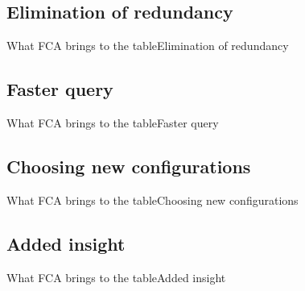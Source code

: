 \subsection{Elimination of redundancy}
\begin{frame}{What FCA brings to the table}{Elimination of redundancy}
\end{frame}

\subsection{Faster query}
\begin{frame}{What FCA brings to the table}{Faster query}
\end{frame}

\subsection{Choosing new configurations}
\begin{frame}{What FCA brings to the table}{Choosing new configurations}
\end{frame}

\subsection{Added insight}
\begin{frame}{What FCA brings to the table}{Added insight}
\end{frame}